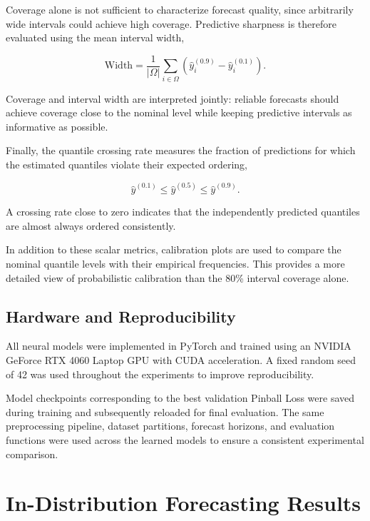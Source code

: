 Coverage alone is not sufficient to characterize forecast quality, since
arbitrarily wide intervals could achieve high coverage. Predictive sharpness
is therefore evaluated using the mean interval width,

\begin{equation}
    \mathrm{Width}
    =
    \frac{1}{|\Omega|}
    \sum_{i\in\Omega}
    \left(
        \hat{y}^{(0.9)}_i
        -
        \hat{y}^{(0.1)}_i
    \right).
    \label{eq:interval_width}
\end{equation}

Coverage and interval width are interpreted jointly: reliable forecasts
should achieve coverage close to the nominal level while keeping predictive
intervals as informative as possible.

Finally, the quantile crossing rate measures the fraction of predictions for
which the estimated quantiles violate their expected ordering,

\begin{equation}
    \hat{y}^{(0.1)}
    \leq
    \hat{y}^{(0.5)}
    \leq
    \hat{y}^{(0.9)}.
\end{equation}

A crossing rate close to zero indicates that the independently predicted
quantiles are almost always ordered consistently.

In addition to these scalar metrics, calibration plots are used to compare
the nominal quantile levels with their empirical frequencies. This provides
a more detailed view of probabilistic calibration than the 80\% interval
coverage alone.


\subsection{Hardware and Reproducibility}
\label{subsec:hardware}

All neural models were implemented in PyTorch and trained using an NVIDIA
GeForce RTX 4060 Laptop GPU with CUDA acceleration. A fixed random seed of
42 was used throughout the experiments to improve reproducibility.

Model checkpoints corresponding to the best validation Pinball Loss were
saved during training and subsequently reloaded for final evaluation. The
same preprocessing pipeline, dataset partitions, forecast horizons, and
evaluation functions were used across the learned models to ensure a
consistent experimental comparison.

\section{In-Distribution Forecasting Results}
\label{sec:in_distribution_results}


